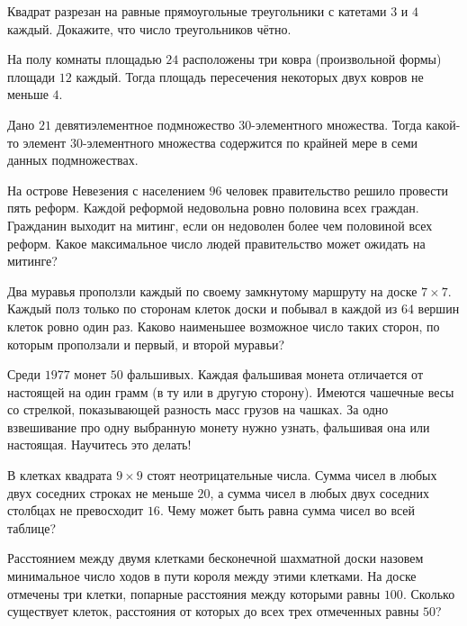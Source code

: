 \documentclass[12pt]{book}
\begin{document}
\begin{task}
Квадрат разрезан на равные прямоугольные треугольники с катетами $3$ и $4$ каждый. Докажите, что число треугольников чётно. 
\end{task}

\begin{task}
На полу комнаты площадью $24$ расположены три ковра (произвольной формы) площади $12$ каждый. Тогда площадь пересечения некоторых двух ковров не меньше $4$. 
\end{task}

\begin{task}
Дано $21$ девятиэлементное подмножество $30$-элементного множества. Тогда какой-то элемент $30$-элементного множества содержится по крайней мере в семи данных подмножествах.
\end{task}

\begin{task}
На острове Невезения с населением $96$ человек правительство решило провести пять реформ. Каждой реформой недовольна ровно половина всех граждан. Гражданин выходит на митинг, если он недоволен более чем половиной всех реформ. Какое максимальное число людей правительство может ожидать на митинге? 
\end{task}

\begin{task}
Два муравья проползли каждый по своему замкнутому маршруту на доске $7 \times 7$. Каждый полз только по сторонам клеток доски и побывал в каждой из $64$ вершин клеток ровно один раз. Каково наименьшее возможное число таких сторон, по которым проползали и первый, и второй муравьи?
\end{task}

\begin{task}
Среди $1977$ монет $50$ фальшивых. Каждая фальшивая монета отличается от настоящей на один грамм (в ту или в другую сторону). Имеются чашечные весы со стрелкой, показывающей разность масс грузов на чашках. За одно взвешивание про одну выбранную монету нужно узнать, фальшивая она или настоящая. Научитесь это делать!
\end{task}

\begin{task}
В клетках квадрата $9 \times 9$ стоят неотрицательные числа. Сумма чисел в любых двух соседних строках не меньше $20$, а сумма чисел в любых двух соседних столбцах не превосходит $16$. Чему может быть равна сумма чисел во всей таблице?
\end{task}

\begin{task}
Расстоянием между двумя клетками бесконечной шахматной доски назовем минимальное число ходов в пути короля между этими клетками. На доске отмечены три клетки, попарные расстояния между которыми равны $100$. Сколько существует клеток, расстояния от которых до всех трех отмеченных равны $50$?
\end{task}
\end{document}
